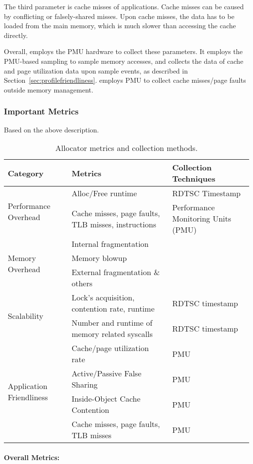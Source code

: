 The third parameter is cache misses of applications. Cache misses can be caused by conflicting or falsely-shared misses. Upon cache misses, the data has to be loaded from the main memory, which is much slower than accessing the cache directly. 

Overall, \MP{} employs the PMU hardware to collect these parameters. It employs the PMU-based sampling to sample memory accesses, and collects the data of cache and page utilization data upon sample events, as described in Section~\ref{sec:profilefriendliness}. \MP{} employs PMU to collect cache misses/page faults outside memory management.

\subsubsection{Important Metrics}


Based on the above description. 
\begin{table}[h]
  \centering
  \footnotesize
\begin{tabular}{l | l | l}
\hline
Category & Metrics & Collection Techniques \\ \hline
\multirow{2}{*}{Performance Overhead} & {Alloc/Free runtime} & RDTSC Timestamp\\ \cline{2-3}
& {Cache misses, page faults, TLB misses, instructions} & Performance Monitoring Units (PMU) \\ \hline
\multirow{3}{*}{Memory Overhead} & Internal fragmentation & \\ \cline{2-3}
	& Memory blowup &  \\ \cline{2-3}
& {External fragmentation \& others} &  \\ \hline
\multirow{2}{*}{Scalability} & Lock's acquisition, contention rate, runtime & RDTSC timestamp\\ \cline{2-3}
& {Number and runtime of memory related syscalls} &  RDTSC timestamp \\ \hline
\multirow{4}{*}{Application Friendliness} & Cache/page utilization rate & PMU  \\ \cline{2-3}
& Active/Passive False Sharing &  PMU\\ \cline{2-3}
& Inside-Object Cache Contention &  PMU \\ \cline{2-3}
& Cache misses, page faults, TLB misses & PMU\\ \hline
  \end{tabular}
  \centering
  \caption{Allocator metrics and collection methods.\label{table:alldata}}
\end{table}

\paragraph{Overall Metrics:} 


